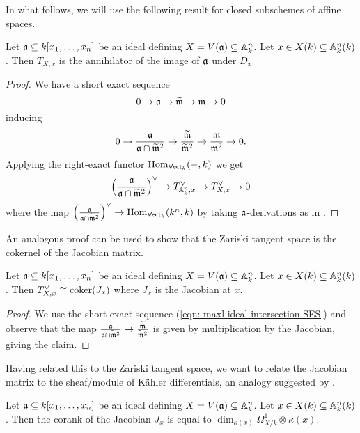 In what follows, we will use the following result for closed subschemes of affine spaces. 
\begin{proposition}\label{prop: annihilator is differentials}
    Let $\mathfrak{a}\subseteq k[x_{1},\dots,x_{n}]$ be an ideal defining $X=V(\mathfrak{a})\subseteq \mathbb{A}^{n}_{k}$. Let $x\in X(k)\subseteq\mathbb{A}^{n}_{k}(k)$. Then $T_{X,x}$ is the annihilator of the image of $\mathfrak{a}$ under $D_{x}$
\end{proposition}
\begin{proof}
    We have a short exact sequence 
    $$0\to\mathfrak{a}\to\widetilde{\mathfrak{m}}\to\mathfrak{m}\to 0$$
    inducing 
    \begin{equation}\label{eqn: maxl ideal intersection SES}
        0\to\frac{\mathfrak{a}}{\mathfrak{a}\cap\widetilde{\mathfrak{m}}^{2}}\to\frac{\widetilde{\mathfrak{m}}}{\widetilde{\mathfrak{m}}^{2}}\to\frac{\mathfrak{m}}{\mathfrak{m}^{2}}\to0.
    \end{equation}
    Applying the right-exact functor $\mathrm{Hom}_{\mathsf{Vect}_{k}}(-,k)$ we get 
    $$\left(\frac{\mathfrak{a}}{\mathfrak{a}\cap\widetilde{\mathfrak{m}}^{2}}\right)^{\vee}\to T_{\mathbb{A}^{n}_{k},x}^{\vee}\to T_{X,x}^{\vee}\to0$$
    where the map $\left(\frac{\mathfrak{a}}{\mathfrak{a}\cap\widetilde{\mathfrak{m}}^{2}}\right)^{\vee}\to \mathrm{Hom}_{\mathsf{Vect}_{k}}(k^{n},k)$ by taking $\mathfrak{a}$-derivations as in . 
\end{proof}
An analogous proof can be used to show that the Zariski tangent space is the cokernel of the Jacobian matrix. 
\begin{corollary}\label{corr: dimension is corank jacobian}
    Let $\mathfrak{a}\subseteq k[x_{1},\dots,x_{n}]$ be an ideal defining $X=V(\mathfrak{a})\subseteq \mathbb{A}^{n}_{k}$. Let $x\in X(k)\subseteq\mathbb{A}^{n}_{k}(k)$. Then $T_{X,x}^{\vee}\cong\mathrm{coker}(J_{x})$ where $J_{x}$ is the Jacobian at $x$. 
\end{corollary}
\begin{proof}
    We use the short exact sequence (\ref{eqn: maxl ideal intersection SES}) and observe that the map $\frac{\mathfrak{a}}{\mathfrak{a}\cap \widetilde{\mathfrak{m}}^{2}}\to\frac{\widetilde{\mathfrak{m}}}{\widetilde{\mathfrak{m}}^{2}}$ is given by multiplication by the Jacobian, giving the claim. 
\end{proof}
Having related this to the Zariski tangent space, we want to relate the Jacobian matrix to the sheaf/module of K\"{a}hler differentials, an analogy suggested by . 
\begin{proposition}\label{prop: corank of Jacobian is base change of differentials}
    Let $\mathfrak{a}\subseteq k[x_{1},\dots,x_{n}]$ be an ideal defining $X=V(\mathfrak{a})\subseteq \mathbb{A}^{n}_{k}$. Let $x\in X(k)\subseteq\mathbb{A}^{n}_{k}(k)$. Then the corank of the Jacobian $J_{x}$ is equal to $\dim_{\kappa(x)}\Omega_{X/k}^{1}\otimes\kappa(x)$. 
\end{proposition} 
